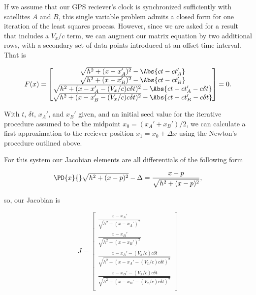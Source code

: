 If we assume that our GPS reciever's clock is synchronized sufficiently with satellites $A$ and $B$, this single variable problem admits a closed form for one iteration of the least squares process.  However, since we are asked for a result that includes a $V_x/c$ term, we can augment our matrix equation by two additional rows, with a secondary set of data points introduced at an offset time interval.  That is

\begin{equation}\label{eqn:relativisticElectrodynamicsA1:360}
F(x) = 
\begin{bmatrix}
\sqrt{ h^2 + (x - x_A')^2 } - \Abs{c t - c t_A'} \\
\sqrt{ h^2 + (x - x_B')^2 } - \Abs{c t - c t_B'} \\
\sqrt{ h^2 + (x - x_A' - (V_x/c) c \delta t)^2 } - \Abs{c t - c t_A' - c \delta t} \\
\sqrt{ h^2 + (x - x_B' - (V_x/c) c \delta t)^2 } - \Abs{c t - c t_B' - c \delta t} \\
\end{bmatrix} = 0.
\end{equation}

With $t$, $\delta t$, $x_A'$, and $x_B'$ given, and an initial seed value for the iterative procedure assumed to be the midpoint $x_0 = (x_A' + x_B')/2$, we can calculate a first approximation to the reciever position $x_1 = x_0 + \Delta x$ using the Newton's procedure outlined above.

For this system our Jacobian elements are all differentials of the following form

\begin{equation}\label{eqn:relativisticElectrodynamicsA1:370}
\PD{x}{} \sqrt{ h^2 + (x - p)^2 } - \Delta = \frac{x-p}{\sqrt{h^2 + (x-p)^2}},
\end{equation}

so, our Jacobian is

\begin{equation}\label{eqn:relativisticElectrodynamicsA1:380}
J = 
\begin{bmatrix}
\frac{x - x_A'}{\sqrt{ h^2 + (x - x_A')^2 } } \\
\frac{x - x_B'}{\sqrt{ h^2 + (x - x_B')^2 } } \\
\frac{x - x_A' - (V_x/c) c \delta t}{\sqrt{ h^2 + (x - x_A' - (V_x/c) c \delta t)^2 } } \\
\frac{x - x_B' - (V_x/c) c \delta t}{\sqrt{ h^2 + (x - x_B' - (V_x/c) c \delta t)^2 } } \\
\end{bmatrix}
\end{equation}

